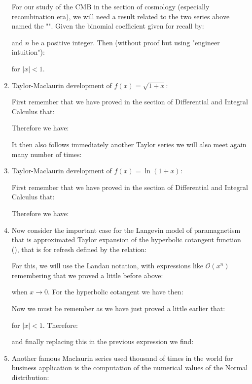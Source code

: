 \begin{enumerate}
		For our study of the CMB in the section of cosmology (especially recombination era), we will need a result related to the two series above named the "\label{binomial theorem for negative integer exponents}". Given the binomial coefficient given for recall by:
		
		and $n$ be a positive integer. Then (without proof but using "engineer intuition"):
		
		for $|x|<1$.
		
		\item  Taylor-Maclaurin development of $f(x)=\sqrt{1+x}$:
		
		First remember that we have proved in the section of Differential and Integral Calculus that:
		
		Therefore we have:
		
		It then also follows immediately another Taylor series we will also meet again many  number of times:
		
		
		\item  Taylor-Maclaurin development of $f(x)=\ln(1+x)$\label{maclaurin dev natural logarithm}:
		
		First remember that we have proved in the section of Differential and Integral Calculus that:
		
		Therefore we have:
		
		
		\item  Now consider the important case for the Langevin model of paramagnetism that is approximated Taylor expansion of the hyperbolic cotangent function (), that is for refresh defined by the relation:
		
		For this, we will use the Landau notation, with expressions like $\mathcal{O}(x^n)$ remembering that we proved a little before above:
		
		when $x \rightarrow 0$.
		For the hyperbolic cotangent we have then:
		
		Now we must be remember as we have just proved a little earlier that:
		
		for $\vert x \vert < 1$. Therefore:
		
		and finally replacing this in the previous expression we find:
		
		
		\item  Another famous Maclaurin series used thousand of times in the world for business application is the computation of the numerical values of the Normal distribution:
		

\end{enumerate}
